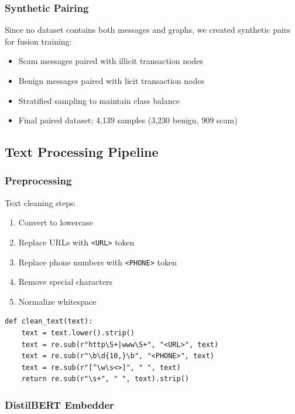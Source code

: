 \subsubsection{Synthetic Pairing}

Since no dataset contains both messages and graphs, we created synthetic pairs for fusion training:
\begin{itemize}
    \item Scam messages paired with illicit transaction nodes
    \item Benign messages paired with licit transaction nodes
    \item Stratified sampling to maintain class balance
    \item Final paired dataset: 4,139 samples (3,230 benign, 909 scam)
\end{itemize}

\subsection{Text Processing Pipeline}

\subsubsection{Preprocessing}

Text cleaning steps:
\begin{enumerate}
    \item Convert to lowercase
    \item Replace URLs with \texttt{<URL>} token
    \item Replace phone numbers with \texttt{<PHONE>} token
    \item Remove special characters
    \item Normalize whitespace
\end{enumerate}

\begin{lstlisting}[caption=Text Preprocessing Function]
def clean_text(text):
    text = text.lower().strip()
    text = re.sub(r"http\S+|www\S+", "<URL>", text)
    text = re.sub(r"\b\d{10,}\b", "<PHONE>", text)
    text = re.sub(r"[^\w\s<>]", " ", text)
    return re.sub(r"\s+", " ", text).strip()
\end{lstlisting}

\subsubsection{DistilBERT Embedder}

